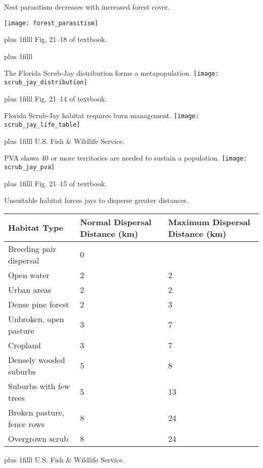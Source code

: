 \documentclass[t]{beamer}
\newcommand\imagecredit[1]{%
	\vskip0pt plus 1filll \tiny #1}%
\begin{document}
\begin{frame}[t,plain]{Nest parasitism decreases with increased forest cover.}
	\begin{center}
		\texttt{[image: forest\_parasitism]}
	\end{center}	

	\imagecredit{\hfill Fig. 21–18 of textbook.}
\end{frame}

{
\begin{frame}[t,plain]{}
	\imagecredit{\textcolor{white}{Andrea Westmoreland, Flickr Creative Commons.}}
\end{frame}
}

\begin{frame}[t,plain]{The Florida Scrub-Jay distribution forms a metapopulation.}
	\centering
		\texttt{[image: scrub\_jay\_distribution]}

	\imagecredit{\hfill Fig. 21–14 of textbook.}
\end{frame}


\begin{frame}[t,plain]{Florida Scrub-Jay habitat requires burn management.}
	\centering
		\texttt{[image: scrub\_jay\_life\_table]}

	\imagecredit{\hfill U.S. Fish \& Wildlife Service.}
\end{frame}

\begin{frame}[t,plain]{PVA shows 40 or more territories are needed to sustain a population.}
	\centering
		\texttt{[image: scrub\_jay\_pva]}

	\imagecredit{\hfill Fig. 21–15 of textbook.}
\end{frame}

\begin{frame}[t,plain]{Unsuitable habitat forces jays to disperse greater distances.}
	\begin{center}
		\begin{tabular}{@{}L{5cm}C{2.5cm}C{2.5cm}@{}}
		\toprule
		\vfill Habitat Type 	&	Normal Dispersal Distance (km)	&	Maximum Dispersal Distance (km) \\
		\midrule
		Breeding pair dispersal & 0 & \textemdash \\
		Open water	&	2	&	2 \\
		Urban areas	&	2	&	2  \\
		Dense pine forest	&	2	&	3  \\
		Unbroken, open pasture	&	3	&	7  \\
		Cropland	&	3	&	7  \\
		Densely wooded suburbs	&	5	&	8  \\
		Suburbs with few trees	&	5	&	13  \\
		Broken pasture, fence rows	&	8	&	24  \\
		Overgrown scrub 	&	8	&	24  \\
		\bottomrule
		\end{tabular}
	\end{center}
	\imagecredit{\hfill U.S. Fish \& Wildlife Service.}
\end{frame}
\end{document}
